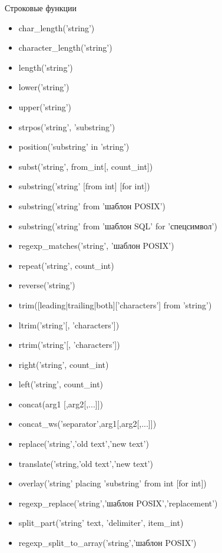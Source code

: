 \documentclass[12pt]{article}
\begin{document}
\begin{nota}{Строковые функции}
    \begin{itemize}
        \item char\_length('string')
        \item character\_length('string')
        \item length('string')
        \item lower('string')
        \item upper('string')
        \item strpos('string', 'substring')
        \item position('substring' in 'string')
        \item subst('string', from\_int[, count\_int])
        \item substring('string' [from int] [for int])
        \item substring('string' from 'шаблон POSIX')
        \item substring('string' from 'шаблон SQL' for 'спецсимвол')
        \item regexp\_matches('string', 'шаблон POSIX')
        \item repeat('string', count\_int)
        \item reverse('string')
        \item trim([leading|trailing|both]['characters'] from 'string')
        \item ltrim('string'[, 'characters'])
        \item rtrim('string'[, 'characters'])
        \item right('string', count\_int)
        \item left('string', count\_int)
        \item concat(arg1 [,arg2[,...]])
        \item concat\_ws('separator',arg1[,arg2[,...]])
        \item replace('string','old text','new text')
        \item translate('string,'old text','new text')
        \item overlay('string' placing 'substring' from int [for int])
        \item regexp\_replace('string','шаблон POSIX','replacement')
        \item split\_part('string' text, 'delimiter', item\_int)
        \item regexp\_split\_to\_array('string','шаблон POSIX')
    \end{itemize}
\end{nota}
\end{document}
